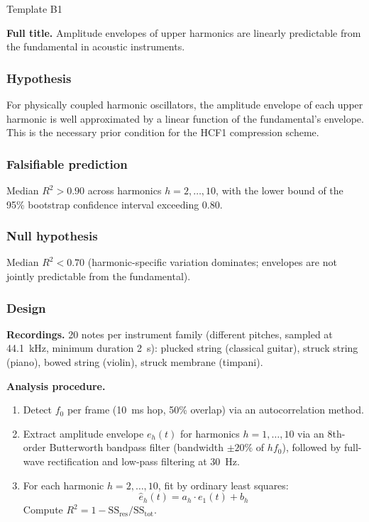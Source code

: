 \documentclass[11pt, a4paper]{article}
\newcommand{\hcf}{HCF1}
\begin{document}
\begin{predbox}{Template B1}

\textbf{Full title.}
Amplitude envelopes of upper harmonics are linearly predictable from the
fundamental in acoustic instruments.

\subsubsection{Hypothesis}

For physically coupled harmonic oscillators, the amplitude envelope of each upper
harmonic is well approximated by a linear function of the fundamental's envelope.
This is the necessary prior condition for the \hcf{} compression scheme.

\subsubsection{Falsifiable prediction}

Median $R^2 > 0.90$ across harmonics $h = 2, \ldots, 10$, with the lower bound
of the 95\% bootstrap confidence interval exceeding 0.80.

\subsubsection{Null hypothesis}

Median $R^2 < 0.70$ (harmonic-specific variation dominates; envelopes are not
jointly predictable from the fundamental).

\subsubsection{Design}

\textbf{Recordings.}
20 notes per instrument family (different pitches, sampled at 44.1~kHz, minimum
duration 2~s): plucked string (classical guitar), struck string (piano), bowed
string (violin), struck membrane (timpani).

\textbf{Analysis procedure.}
\begin{enumerate}
  \item Detect $f_0$ per frame (10~ms hop, 50\% overlap) via an autocorrelation
    method.
  \item Extract amplitude envelope $e_h(t)$ for harmonics $h = 1, \ldots, 10$
    via an 8th-order Butterworth bandpass filter (bandwidth $\pm 20\%$ of $hf_0$),
    followed by full-wave rectification and low-pass filtering at 30~Hz.
  \item For each harmonic $h = 2, \ldots, 10$, fit by ordinary least squares:
    \[
      \hat{e}_h(t) = a_h \cdot e_1(t) + b_h
    \]
    Compute $R^2 = 1 - \mathrm{SS}_\text{res} / \mathrm{SS}_\text{tot}$.
\end{enumerate}


\end{predbox}
\end{document}

